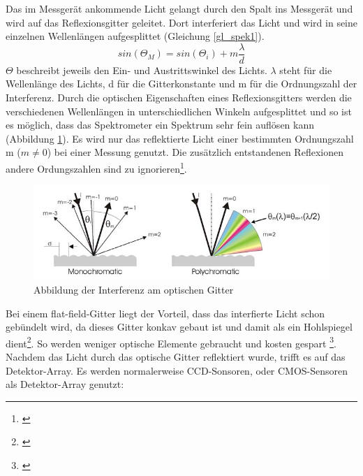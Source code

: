 Das im Messgerät ankommende Licht gelangt durch den Spalt  ins Messgerät und wird auf das Reflexionsgitter geleitet. Dort interferiert das Licht und wird in seine einzelnen Wellenlängen aufgesplittet (Gleichung \ref{gl_spek1}).
\begin{equation}\label{gl_spek1}
		sin(\Theta_{M})=sin(\Theta_{i})+m \frac{\lambda}{d}
\end{equation}
$\Theta$ beschreibt jeweils den Ein- und Austrittswinkel des Lichts. $\lambda$ steht für die Wellenlänge des Lichts, d für die Gitterkonstante und m für die Ordnungszahl der Interferenz. Durch die optischen Eigenschaften eines Reflexionsgitters werden die verschiedenen Wellenlängen in unterschiedlichen Winkeln aufgesplittet und so ist es möglich, dass das Spektrometer ein Spektrum sehr fein auflösen kann (Abbildung \ref{b_spek1}). Es wird nur das reflektierte Licht einer bestimmten Ordnungszahl m ($m \neq 0$) bei einer Messung genutzt. Die zusätzlich entstandenen Reflexionen andere Ordungszahlen sind zu ignorieren\footnote{\cite[6]{jeti}}. 

\begin{figure}[htp]     %
\centering
\includegraphics[width=1.0\textwidth]{bilder/spek1} 
\caption {Abbildung der Interferenz am optischen Gitter\protect\footnotemark}\label{b_spek1}
\end{figure}

Bei einem flat-field-Gitter liegt der Vorteil, dass das interfierte Licht schon gebündelt wird, da dieses Gitter konkav gebaut ist und damit als ein Hohlspiegel dient\footnote{\cite{wiki}}. So werden weniger optische Elemente gebraucht und kosten gespart \footnote{\cite[7]{jeti}}.\\
Nachdem das Licht durch das optische Gitter reflektiert wurde, trifft es auf das Detektor-Array. Es werden normalerweise CCD-Sonsoren, oder CMOS-Sensoren als Detektor-Array genutzt:


